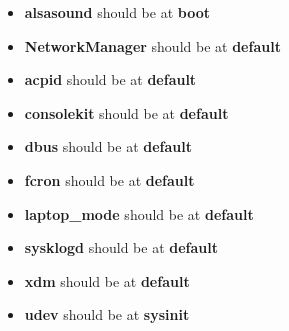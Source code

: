 \documentclass[10pt,a4paper]{article}
\begin{document}
                    \begin{itemize}
                        \item \textbf{alsasound} should be at \textbf{boot}
                        \item \textbf{NetworkManager} should be at \textbf{default}
                        \item \textbf{acpid} should be at \textbf{default}
                        \item \textbf{consolekit} should be at \textbf{default}
                        \item \textbf{dbus} should be at \textbf{default}
                        \item \textbf{fcron} should be at \textbf{default}
                        \item \textbf{laptop\_mode} should be at \textbf{default}
                        \item \textbf{sysklogd} should be at \textbf{default}
                        \item \textbf{xdm} should be at \textbf{default}
                        \item \textbf{udev} should be at \textbf{sysinit}
                    \end{itemize}
                    
\end{document}
